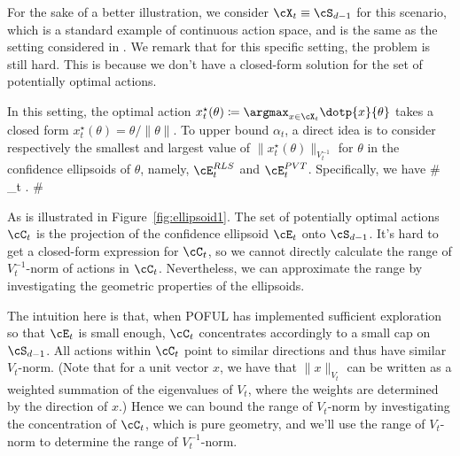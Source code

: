 For the sake of a better illustration, we consider 
 $\cX_t \equiv \cS_{d-1}$ for this scenario, which is a standard example of continuous action space, and is the same as the setting considered in \cite{abeille2017linear}. We remark that for this specific setting, the problem is still hard. This is because we don't have a closed-form solution for the set of potentially optimal actions.
 
 In this setting, the optimal action $x_t^\star(\theta )  \coloneqq \argmax_{x\in \cX_t} \dotp{x}{\theta}$ takes a closed form $ x^\star_t(\theta ) = \theta/\|\theta\|$. To upper bound $\alpha_t$, a direct idea is to consider respectively the smallest and largest value of $\|x^\star_t(\theta)\|_{V_t^{-1}}$ for $\theta$ in the confidence ellipsoids of $\theta$, namely, $\cE^{\RLS}_t$ and $\cE^{\PVT}_t$. Specifically, we have 
  \# \label{eq:alpha_hat_raw}
 \alpha_t \leq {}.
 \#
 

 
As is illustrated in Figure~\ref{fig:ellipsoid1}. The set of potentially optimal actions $\cC_t$ is the projection of the confidence ellipsoid $\cE_t$  onto $\cS_{d-1}$. It's hard to get a closed-form expression for $\cC_t$, so we cannot directly calculate the range of $V_t^{-1}$-norm of actions in $\cC_t$. Nevertheless, we can approximate the range by investigating the geometric properties of the ellipsoids.  
 
 
The intuition here is that, when POFUL has implemented sufficient exploration so that $\cE_t$ is small enough, $\cC_t$ concentrates accordingly to a small cap on $\cS_{d-1}$. All actions within $\cC_t$  point to similar directions and thus have similar $V_t$-norm. (Note that for a unit vector $x$, we have that $\|x\|_{V_t}$ can be written as a weighted summation of the eigenvalues of $V_t$, where the weights are determined by the direction of $x$.) Hence we can bound the range of $V_t$-norm by investigating the concentration of  $\cC_t$, which is pure geometry, and we'll use the range of $V_t$-norm to determine the range of $V_t^{-1}$-norm.
 
 
  

 

